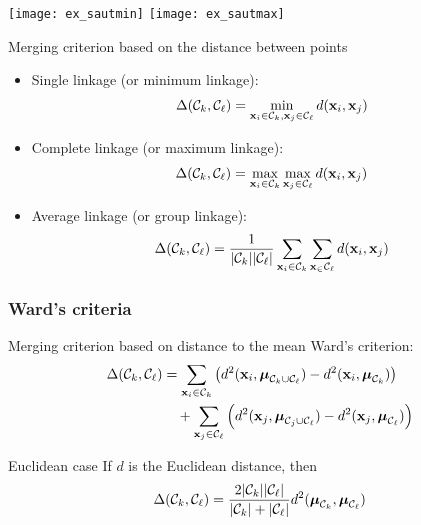 \documentclass{beamer}\usepackage[]{graphicx}\usepackage[]{color}
\begin{document}
\begin{frame}

  \begin{center}
    \texttt{[image: ex\_sautmin]}
    \hspace*{.1\textwidth}
    \texttt{[image: ex\_sautmax]}
  \end{center}

  \begin{block}{Merging criterion based on the distance between points}
    \begin{itemize}
      \item Single linkage (or minimum linkage):
      \begin{align*}
        \Delta(\mathcal{C}_k, \mathcal{C}_\ell) = \min_{\mathbf{x}_i \in \mathcal{C}_k, \mathbf{x}_j \in \mathcal{C}_\ell} d(\mathbf{x}_i, \mathbf{x}_j)
      \end{align*}
      \item Complete linkage (or maximum linkage):
      \begin{align*}
        \Delta(\mathcal{C}_k, \mathcal{C}_\ell) = \max_{\mathbf{x}_i \in \mathcal{C}_k} \max_{\mathbf{x}_j \in \mathcal{C}_\ell}d(\mathbf{x}_i, \mathbf{x}_j)
    \end{align*}
    \item Average linkage (or group linkage):
      \begin{align*}
        \Delta(\mathcal{C}_k, \mathcal{C}_\ell) = \frac{1}{|\mathcal{C}_k||\mathcal{C}_\ell|} \sum_{\mathbf{x}_i \in \mathcal{C}_k}\sum_{\mathbf{x}_ \in\mathcal{C}_\ell} d(\mathbf{x}_i, \mathbf{x}_j)
      \end{align*}
    \end{itemize}
  \end{block}

\end{frame}

\begin{frame}
  \frametitle{Ward's criteria}
  
  \begin{block}{Merging criterion based on distance to the mean}
    Ward's criterion:
    \begin{align*}
      \Delta(\mathcal{C}_k, \mathcal{C}_\ell) 
        & = \sum_{\mathbf{x}_i \in \mathcal{C}_k} \left( d^2(\mathbf{x}_i, \boldsymbol{\mu}_{\mathcal{C}_k \cup \mathcal{C}_\ell} ) - d^2(\mathbf{x}_i, \boldsymbol{\mu}_{\mathcal{C}_k}) \right) \\
        & \quad + \sum_{\mathbf{x}_j \in \mathcal{C}_\ell} \left( d^2(\mathbf{x}_j, \boldsymbol{\mu}_{\mathcal{C}_j \cup \mathcal{C}_\ell} ) - d^2(\mathbf{x}_j, \boldsymbol{\mu}_{\mathcal{C}_\ell}) \right)
      \end{align*}
    \end{block}

    \begin{block}{Euclidean case}
       If $d$ is the Euclidean distance, then
      \begin{align*}
        \Delta(\mathcal{C}_k, \mathcal{C}_\ell) = \frac{2|\mathcal{C}_k||\mathcal{C}_\ell|}{|\mathcal{C}_k|+|\mathcal{C}_\ell|}d^2(\boldsymbol{\mu}_{\mathcal{C}_k}, \boldsymbol{\mu}_{\mathcal{C}_\ell})
      \end{align*}
    \end{block}

\end{frame}
\end{document}
